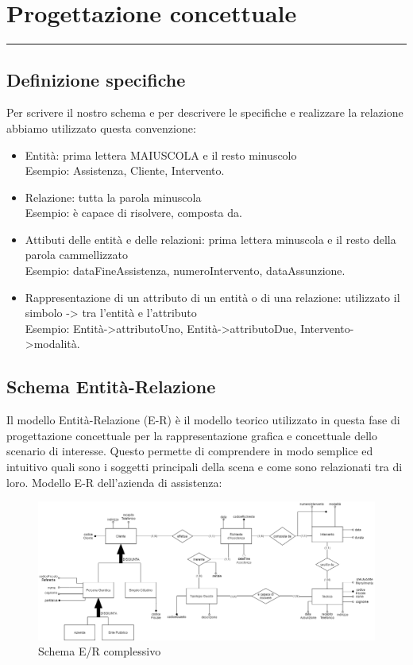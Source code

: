 \documentclass[legalpaper]{article}
\begin{document}
\newpage
\section{Progettazione concettuale}
\rule{\linewidth}{1.5pt}

\subsection{Definizione specifiche}
Per scrivere il nostro schema e per descrivere le specifiche e realizzare la relazione abbiamo utilizzato questa convenzione:
\begin{itemize}
	\item Entità: prima lettera MAIUSCOLA e il resto minuscolo\\
	Esempio: Assistenza, Cliente, Intervento.
	\item Relazione: tutta la parola minuscola\\
	Esempio: è capace di risolvere, composta da.
	\item Attibuti delle entità e delle relazioni: prima lettera minuscola e il resto della parola cammellizzato\\
	Esempio: dataFineAssistenza, numeroIntervento, dataAssunzione.
	\item Rappresentazione di un attributo di un entità o di una relazione: utilizzato il simbolo      ->      tra l'entità e l'attributo\\
	Esempio: Entità->attributoUno, Entità->attributoDue, Intervento->modalità.
\end{itemize}
\newpage
\subsection{Schema Entità-Relazione}
Il modello Entità-Relazione (E-R) è il modello teorico utilizzato in questa fase di progettazione concettuale per la rappresentazione grafica e concettuale dello scenario di interesse. Questo permette di comprendere in modo semplice ed intuitivo quali sono i soggetti principali della scena e come sono relazionati tra di loro. 
Modello E-R dell'azienda di assistenza:
\newline

\begin{figure}[ht]
	\centering
	\includegraphics[width=1.1\linewidth]{image/schema_er.png}
	\caption[]{Schema E/R complessivo}
	\label{fig:erprototipov2}
\end{figure}
\end{document}
